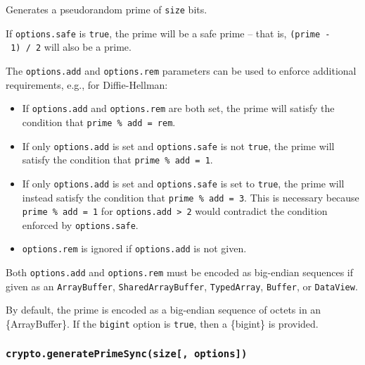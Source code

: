 Generates a pseudorandom prime of \texttt{size} bits.

If \texttt{options.safe} is \texttt{true}, the prime will be a safe
prime -- that is, \texttt{(prime\ -\ 1)\ /\ 2} will also be a prime.

The \texttt{options.add} and \texttt{options.rem} parameters can be used
to enforce additional requirements, e.g., for Diffie-Hellman:

\begin{itemize}
\tightlist
\item
  If \texttt{options.add} and \texttt{options.rem} are both set, the
  prime will satisfy the condition that \texttt{prime\ \%\ add\ =\ rem}.
\item
  If only \texttt{options.add} is set and \texttt{options.safe} is not
  \texttt{true}, the prime will satisfy the condition that
  \texttt{prime\ \%\ add\ =\ 1}.
\item
  If only \texttt{options.add} is set and \texttt{options.safe} is set
  to \texttt{true}, the prime will instead satisfy the condition that
  \texttt{prime\ \%\ add\ =\ 3}. This is necessary because
  \texttt{prime\ \%\ add\ =\ 1} for
  \texttt{options.add\ \textgreater{}\ 2} would contradict the condition
  enforced by \texttt{options.safe}.
\item
  \texttt{options.rem} is ignored if \texttt{options.add} is not given.
\end{itemize}

Both \texttt{options.add} and \texttt{options.rem} must be encoded as
big-endian sequences if given as an \texttt{ArrayBuffer},
\texttt{SharedArrayBuffer}, \texttt{TypedArray}, \texttt{Buffer}, or
\texttt{DataView}.

By default, the prime is encoded as a big-endian sequence of octets in
an \{ArrayBuffer\}. If the \texttt{bigint} option is \texttt{true}, then
a \{bigint\} is provided.

\subsubsection{\texorpdfstring{\texttt{crypto.generatePrimeSync(size{[},\ options{]})}}{crypto.generatePrimeSync(size{[}, options{]})}}\label{crypto.generateprimesyncsize-options}

